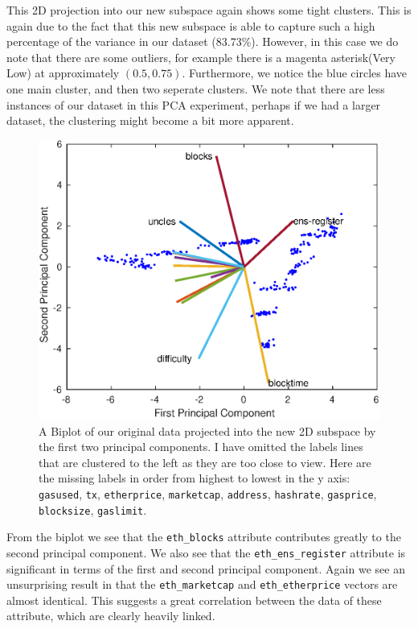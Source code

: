 \documentclass{article}
\begin{document}
This 2D projection into our new subspace again shows some tight clusters. This is again due to the fact that this new subspace is able to capture such a high percentage of the variance in our dataset (83.73\%). However, in this case we do note that there are some outliers, for example there is a magenta asterisk(Very Low) at approximately $(0.5, 0.75)$. Furthermore, we notice the blue circles have one main cluster, and then two seperate clusters. We note that there are less instances of our dataset in this PCA experiment, perhaps if we had a larger dataset, the clustering might become a bit more apparent.

\begin{figure}[H]
\centering
\caption{A Biplot of our original data projected into the new 2D subspace by the first two principal components. I have omitted the labels lines that are clustered to the left as they are too close to view. Here are the missing labels in order from highest to lowest in the y axis: \texttt{gasused}, \texttt{tx}, \texttt{etherprice}, \texttt{marketcap}, \texttt{address}, \texttt{hashrate}, \texttt{gasprice}, \texttt{blocksize}, \texttt{gaslimit}.}
\includegraphics{local/eth_2d_biplot_supply.eps}
\end{figure}

From the biplot we see that the \texttt{eth\_blocks} attribute contributes greatly to the second principal component. We also see that the \texttt{eth\_ens\_register} attribute is significant in terms of the first and second principal component. Again we see an unsurprising result in that the \texttt{eth\_marketcap} and \texttt{eth\_etherprice} vectors are almost identical. This suggests a great correlation between the data of these attribute, which are clearly heavily linked.
\end{document}
